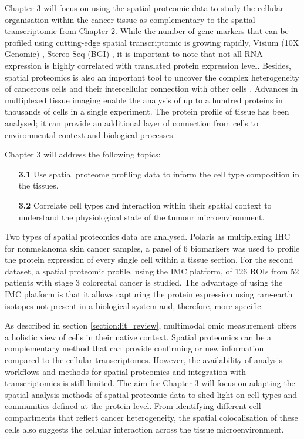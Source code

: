 Chapter 3 will focus on using the spatial proteomic data to study the cellular organisation within the cancer tissue as complementary to the spatial transcriptomic from Chapter 2. While the number of gene markers that can be profiled using cutting-edge spatial transcriptomic is growing rapidly, \ie Visium (10X Genomic) \cite{thrane2018spatially, moncada2019integrating,ji2020multimodal},  Stereo-Seq (BGI) \cite{wei2022single,chen2022spatiotemporal}, it is important to note that not all RNA expression is highly correlated with translated protein expression level. Besides, spatial proteomics is also an important tool to uncover the complex heterogeneity of cancerous cells and their intercellular connection with other cells \cite{arnol2019modeling, jackson2020single, bodenmiller2016multiplexed}. Advances in multiplexed tissue imaging enable the analysis of up to a hundred proteins in thousands of cells in a single experiment. The protein profile of tissue has been analysed; it can provide an additional layer of connection from cells to environmental context and biological processes. 

Chapter 3 will address the following topics:    
\begin{enumerate}[align=left]
    \item[\textbf{3.1}] Use spatial proteome profiling data to inform the cell type composition in the tissues.
    \item[\textbf{3.2}] Correlate cell types and interaction within their spatial context to understand the physiological state of the tumour microenvironment.
\end{enumerate}

Two types of spatial proteomics data are analysed. Polaris as multiplexing IHC for nonmelanoma skin cancer samples, a panel of 6 biomarkers was used to profile the protein expression of every single cell within a tissue section. For the second dataset, a spatial proteomic profile, using the IMC platform, of 126 ROIs from 52 patients with stage 3 colorectal cancer is studied. The advantage of using the IMC platform is that it allows capturing the protein expression using rare-earth isotopes not present in a biological system and, therefore, more specific. 

As described in section \ref{section:lit_review}, multimodal omic measurement offers a holistic view of cells in their native context. Spatial proteomics can be a complementary method that can provide confirming or new information compared to the cellular transcriptomes. However, the availability of analysis workflows and methods for spatial proteomics and integration with transcriptomics is still limited. The aim for Chapter 3 will focus on adapting the spatial analysis methods of spatial proteomic data to shed light on cell types and communities defined at the protein level. From identifying different cell compartments that reflect cancer heterogeneity, the spatial colocalisation of these cells also suggests the cellular interaction across the tissue microenvironment.             


